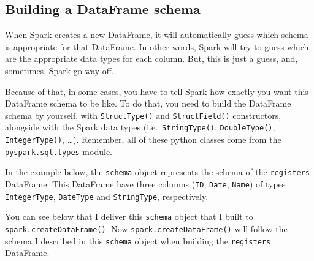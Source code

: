 \documentclass[
  11pt,
  letterpaper,
  DIV=11,
  numbers=noendperiod]{scrreprt}
\begin{document}
\hypertarget{building-a-dataframe-schema}{%
\subsection{Building a DataFrame
schema}\label{building-a-dataframe-schema}}

When Spark creates a new DataFrame, it will automatically guess which
schema is appropriate for that DataFrame. In other words, Spark will try
to guess which are the appropriate data types for each column. But, this
is just a guess, and, sometimes, Spark go way off.

Because of that, in some cases, you have to tell Spark how exactly you
want this DataFrame schema to be like. To do that, you need to build the
DataFrame schema by yourself, with \texttt{StructType()} and
\texttt{StructField()} constructors, alongside with the Spark data types
(i.e.~\texttt{StringType()}, \texttt{DoubleType()},
\texttt{IntegerType()}, \ldots). Remember, all of these python classes
come from the \texttt{pyspark.sql.types} module.

In the example below, the \texttt{schema} object represents the schema
of the \texttt{registers} DataFrame. This DataFrame have three columns
(\texttt{ID}, \texttt{Date}, \texttt{Name}) of types
\texttt{IntegerType}, \texttt{DateType} and \texttt{StringType},
respectively.

You can see below that I deliver this \texttt{schema} object that I
built to \texttt{spark.createDataFrame()}. Now
\texttt{spark.createDataFrame()} will follow the schema I described in
this \texttt{schema} object when building the \texttt{registers}
DataFrame.
\end{document}
